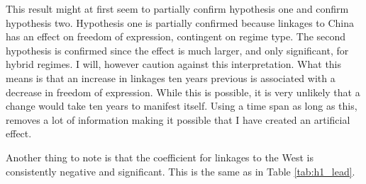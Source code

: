 This result might at first seem to partially confirm hypothesis one and confirm hypothesis two. Hypothesis one is partially confirmed because linkages to China has an effect on freedom of expression, contingent on regime type. The second hypothesis is confirmed since the effect is much larger, and only significant, for hybrid regimes. I will, however caution against this interpretation. What this means is that an increase in linkages ten years previous is associated with a decrease in freedom of expression. While this is possible, it is very unlikely that a change would take ten years to manifest itself. Using a time span as long as this, removes a lot of information making it possible that I have created an artificial effect.

Another thing to note is that the coefficient for linkages to the West is consistently negative and significant. This is the same as in Table \ref{tab:h1_lead}.

